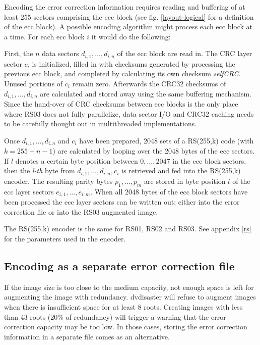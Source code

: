 Encoding the error correction information
 requires reading and buffering of at least
255 sectors comprising the ecc block
(see fig. \ref{layout-logical} for a definition of the ecc block).
A possible encoding algorithm
might process each ecc block at a time. For each ecc block $i$
it would do the following: \smallskip

First, the $n$ data sectors $d_{i,1},\ldots,d_{i,n}$ of the ecc block
are read in. The CRC layer 
sector $c_i$ is initialized, filled in with checksums 
generated by processing the previous ecc block, and completed
by calculating its own checksum {\em selfCRC}. Unused portions of $c_i$
remain zero. Afterwards the
CRC32 checksums of $d_{i,1},\ldots,d_{i,n}$ are calculated
and stored away using the same buffering mechanism. Since the hand-over of
CRC checksums between ecc blocks is the only place where RS03 does 
not fully parallelize, data sector I/O and CRC32 caching needs to be 
carefully thought out in multithreaded implementations. \medskip


Once $d_{i,1},\ldots,d_{i,n}$ and $c_i$ have been prepared, 
2048 sets of a  RS(255,k) code (with $k=255-n-1$) are calculated by 
looping over the 2048 bytes of the ecc sectors. If $l$ denotes
a certain byte position between $0,\ldots,2047$ in the ecc block
sectors, then the {\em l-th} byte from $d_{i,1},\ldots,d_{i,n},c_i$
is retrieved and fed into the RS(255,k) encoder. The resulting
parity bytes $p_1,\ldots,p_m$ are stored in byte position $l$ of the
ecc layer sectors $e_{i,1},\ldots,e_{i,m}$. When all 2048 bytes
of the ecc block sectors have been processed the ecc layer sectors
can be written out; either into the error correction file or into
the RS03 augmented image. \medskip

The RS(255,k) encoder is the same for RS01, RS02 and RS03. See
appendix \ref{rs} for the parameters used in the encoder.

\subsection{Encoding as a separate error correction file}
\label{eccfile}

If the image size is too close to the medium capacity, not enough
space is left for augmenting the image with redundancy. dvdisaster
will refuse to augment images when there is insufficient space
for at least 8 roots. Creating images with less than 43 roots
(20\% of redundancy) will trigger a warning that the error correction
capacity may be too low. In those cases, storing the error correction
information in a separate file comes as an alternative.

